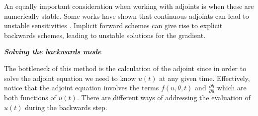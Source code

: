 An equally important consideration when working with adjoints is when these are numerically stable. 
Some works have shown that continuous adjoints can lead to unstable sensitivities \cite{Jensen_Nakshatrala_Tortorelli_2014}.
Implicit forward schemes can give rise to explicit backwards schemes, leading to unstable solutions for the gradient. 

\vspace*{10px}
\noindent \textbf{\textit{Solving the backwards mode}}
\vspace*{5px}

The bottleneck of this method is the calculation of the adjoint since in order to solve the adjoint equation we need to know $u(t)$ at any given time. 
Effectively, notice that the adjoint equation involves the terms $f(u, \theta, t)$ and $\frac{\partial h}{\partial u}$ which are both functions of $u(t)$. 
There are different ways of addressing the evaluation of $u(t)$ during the backwards step.
